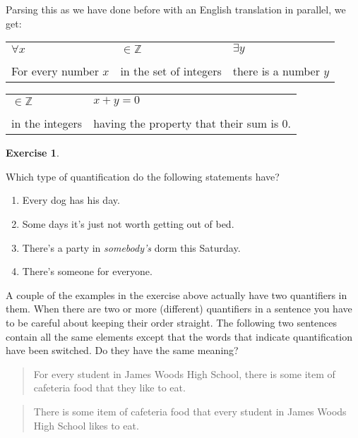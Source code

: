 \documentclass[10pt,]{book}
\theoremstyle{plain}
\theoremstyle{definition}
\theoremstyle{definition}
\newtheorem{exercise}[theorem]{Exercise}
\numberwithin{equation}{section}
\newcommand{\hrulethin}  {\noalign{\hrule height 0.04em}}
\newcommand{\Integers}{{\mathbb Z}}
\begin{document}
    Parsing this as we have done before with an English translation in
    parallel, we get:
\begin{tabular}{lll}
\(\forall x\)&\(\in \Integers\)&\(\exists y\)\tabularnewline[0pt]
&&\tabularnewline\hrulethin
For every number \(x\)&in the set of integers&there is a number \(y\)
\end{tabular}
\begin{tabular}{ll}
\(\in \Integers\)&\(x+y=0\)\tabularnewline[0pt]
&\tabularnewline\hrulethin
in the integers&having the property that
      their sum is \(0\).
\end{tabular}
\begin{exercise}\label{exercise-2}

      Which type of quantification do the following
      statements have?

      \leavevmode%
\begin{enumerate}
\item\hypertarget{li-35}{}
            Every dog has his day.
\item\hypertarget{li-36}{}
            Some days it's just not worth getting out of bed.
\item\hypertarget{li-37}{}
            There's a party in \emph{somebody's} dorm this Saturday.
\item\hypertarget{li-38}{}
            There's someone for everyone.
\end{enumerate}

\end{exercise}
\par

    A couple of the examples in the exercise above actually have two quantifiers
    in them. When there are two or more (different) quantifiers in a sentence
    you have to be careful about keeping their order straight. The following
    two sentences contain all the same elements except that the words that
    indicate quantification have been switched. Do they have the same meaning?
\begin{quote}
  For every student in James Woods High School, there is some item of
  cafeteria food that they like to eat.
  \end{quote}
\begin{quote}
  There is some item of cafeteria food that every student in James Woods 
  High School likes to eat.
  \end{quote}
\typeout{************************************************}
\typeout{************************************************}
\end{document}
